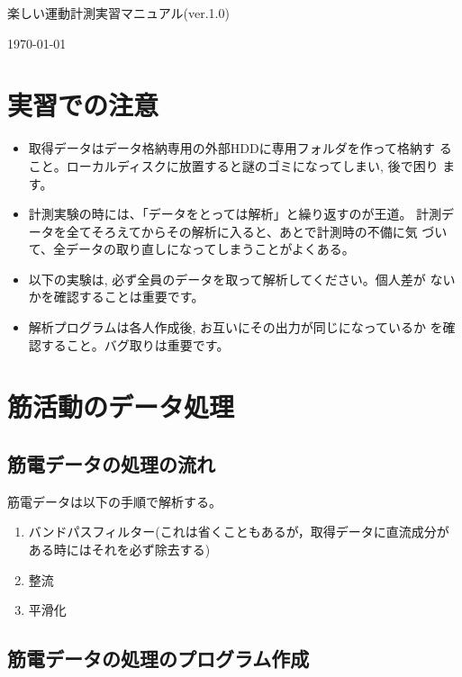 \documentclass{jarticle}
\def\version{1.0}
\begin{document}
\begin{center}
  {\LARGE 楽しい運動計測実習マニュアル(ver.\version)}
\end{center}
\begin{flushright}
\today
\end{flushright}

\section*{実習での注意}
\begin{itemize}
\item 取得データはデータ格納専用の外部HDDに専用フォルダを作って格納す
  ること。ローカルディスクに放置すると謎のゴミになってしまい, 後で困り
  ます。
\item 計測実験の時には、「データをとっては解析」と繰り返すのが王道。
  計測データを全てそろえてからその解析に入ると、あとで計測時の不備に気
  づいて、全データの取り直しになってしまうことがよくある。
\item 以下の実験は, 必ず全員のデータを取って解析してください。個人差が
  ないかを確認することは重要です。
\item 解析プログラムは各人作成後, お互いにその出力が同じになっているか
  を確認すること。バグ取りは重要です。
\end{itemize}

\section{筋活動のデータ処理}

\subsection{筋電データの処理の流れ}
筋電データは以下の手順で解析する。
\begin{enumerate}
\item バンドパスフィルター(これは省くこともあるが，取得データに直流成分がある時にはそれを必ず除去する)
\item 整流
\item 平滑化
\end{enumerate}

\subsection{筋電データの処理のプログラム作成}
\end{document}
